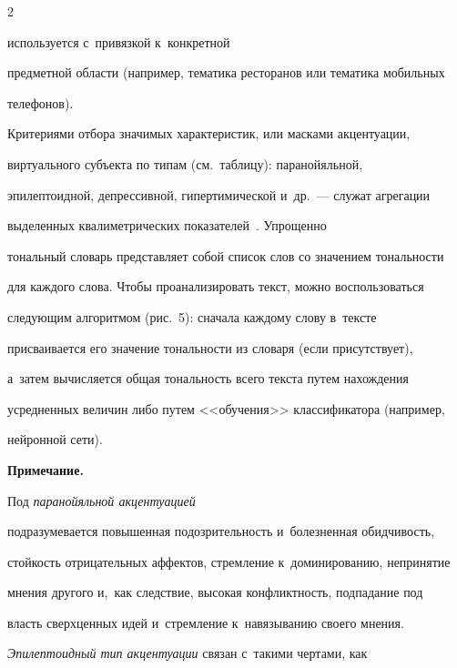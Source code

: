\begin{multicols}{2}





\noindent

 используется с~привязкой к~конкретной 

предметной области (например, тематика ресторанов или тематика мобильных 

телефонов).









  Критериями отбора значимых характеристик, или масками акцентуации, 

виртуального субъекта по типам (см.\ таблицу): паранойяльной, 

эпилептоидной, депрессивной, гипертимической и~др.~--- служат агрегации 

выделенных квалиметрических показателей~\cite{12-sig}. Упрощенно 

тональный словарь представляет собой список слов со значением тональности 

для каждого слова. Чтобы проанализировать текст, можно воспользоваться 

следующим алгоритмом (рис.~5): сначала каждому слову в~тексте 

присваивается его значение тональности из словаря (если присутствует), 

а~затем вычисляется общая тональность всего текста путем нахождения 

усредненных величин либо путем <<обучения>> классификатора (например, 

нейронной сети).

  

  



  {\small  \textbf{Примечание.} 

 Под \textit{паранойяльной акцентуацией} 

подразумевается повышенная подозрительность и~болезненная обидчивость, 

стойкость отрицательных аффектов, стремление к~доминированию, непринятие 

мнения другого и,~как следствие, высокая конфликтность, подпадание под 

власть сверхценных идей и~стремление к~навязыванию своего мнения. 

%

\textit{Эпилептоидный тип акцентуации} связан с~такими чертами, как 

}
\end{multicols}
